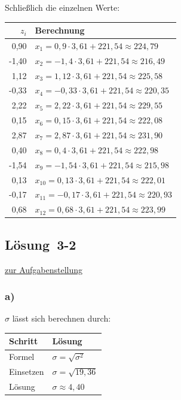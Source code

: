\documentclass[
  11pt,
  ngerman,
  a4paper,
]{report}
\begin{document}
Schließlich die einzelnen Werte:

\begin{table}[H]
\centering
\begin{tabular}{rl}
\toprule
$z_i$ & Berechnung\\
\midrule
0,90 & $x_{1} = 0{,}9 \cdot 3{,}61 + 221{,}54\approx224{,}79$\\
-1,40 & $x_{2} = -1{,}4 \cdot 3{,}61 + 221{,}54\approx216{,}49$\\
1,12 & $x_{3} = 1{,}12 \cdot 3{,}61 + 221{,}54\approx225{,}58$\\
-0,33 & $x_{4} = -0{,}33 \cdot 3{,}61 + 221{,}54\approx220{,}35$\\
2,22 & $x_{5} = 2{,}22 \cdot 3{,}61 + 221{,}54\approx229{,}55$\\
0,15 & $x_{6} = 0{,}15 \cdot 3{,}61 + 221{,}54\approx222{,}08$\\
2,87 & $x_{7} = 2{,}87 \cdot 3{,}61 + 221{,}54\approx231{,}90$\\
0,40 & $x_{8} = 0{,}4 \cdot 3{,}61 + 221{,}54\approx222{,}98$\\
-1,54 & $x_{9} = -1{,}54 \cdot 3{,}61 + 221{,}54\approx215{,}98$\\
0,13 & $x_{10} = 0{,}13 \cdot 3{,}61 + 221{,}54\approx222{,}01$\\
-0,17 & $x_{11} = -0{,}17 \cdot 3{,}61 + 221{,}54\approx220{,}93$\\
0,68 & $x_{12} = 0{,}68 \cdot 3{,}61 + 221{,}54\approx223{,}99$\\
\bottomrule
\end{tabular}
\end{table}

\hypertarget{loesung-3-2}{%
\subsection{Lösung~3-2}\label{loesung-3-2}}

\protect\hyperlink{aufgabe-3-2}{zur Aufgabenstellung}

\hypertarget{a-9}{%
\subsubsection{a)}\label{a-9}}

\(\sigma\) lässt sich berechnen durch:

\begin{table}[H]
\centering
\begin{tabular}{ll}
\toprule
Schritt & Lösung\\
\midrule
Formel & $\sigma=\sqrt{\sigma^2}$\\
Einsetzen & $\sigma=\sqrt{19{,}36}$\\
Lösung & $\sigma\approx4{,}40$\\
\bottomrule
\end{tabular}
\end{table}
\end{document}

